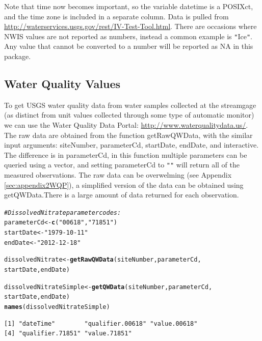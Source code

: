 \documentclass[a4paper,11pt]{article}\usepackage[]{graphicx}\usepackage[]{color}
\makeatletter
\newcommand{\hlstr}[1]{\textcolor[rgb]{0.192,0.494,0.8}{#1}}%
\newcommand{\hlcom}[1]{\textcolor[rgb]{0.678,0.584,0.686}{\textit{#1}}}%
\newcommand{\hlstd}[1]{\textcolor[rgb]{0.345,0.345,0.345}{#1}}%
\newcommand{\hlkwb}[1]{\textcolor[rgb]{0.69,0.353,0.396}{#1}}%
\newcommand{\hlkwd}[1]{\textcolor[rgb]{0.737,0.353,0.396}{\textbf{#1}}}%
\newenvironment{kframe}{%
 \def\at@end@of@kframe{}%
 \ifinner\ifhmode%
  \def\at@end@of@kframe{\end{minipage}}%
  \begin{minipage}{\columnwidth}%
 \fi\fi%
 \def\FrameCommand##1{\hskip\@totalleftmargin \hskip-\fboxsep
 \colorbox{shadecolor}{##1}\hskip-\fboxsep
     \hskip-\linewidth \hskip-\@totalleftmargin \hskip\columnwidth}%
 \MakeFramed {\advance\hsize-\width
   \@totalleftmargin\z@ \linewidth\hsize
   \@setminipage}}%
 {\par\unskip\endMakeFramed%
 \at@end@of@kframe}
\newenvironment{knitrout}{}{} %
\makeatother
\begin{document}
Note that time now becomes important, so the variable datetime is a POSIXct, and the time zone is included in a separate column. Data is pulled from \url{http://waterservices.usgs.gov/rest/IV-Test-Tool.html}. There are occasions where NWIS values are not reported as numbers, instead a common example is \texttt{"}Ice\texttt{"}.  Any value that cannot be converted to a number will be reported as NA in this package.

\newpage


\FloatBarrier

\subsection{Water Quality Values}
\label{sec:usgsWQP}
To get USGS water quality data from water samples collected at the streamgage (as distinct from unit values collected through some type of automatic monitor) we can use the Water Quality Data Portal: \url{http://www.waterqualitydata.us/}. The raw data are obtained from the function  getRawQWData, with the similar input arguments: siteNumber, parameterCd, startDate, endDate, and interactive. The difference is in parameterCd, in this function multiple parameters can be queried using a vector, and setting parameterCd to \texttt{"}\texttt{"} will return all of the measured observations. The raw data can be overwelming (see Appendix \ref{sec:appendix2WQP}), a simplified version of the data can be obtained using getQWData.There is a large amount of data returned for each observation. 


\begin{knitrout}
\color{fgcolor}\begin{kframe}
\begin{alltt}
\hlcom{# Dissolved Nitrate parameter codes:}
\hlstd{parameterCd} \hlkwb{<-} \hlkwd{c}\hlstd{(}\hlstr{"00618"}\hlstd{,}\hlstr{"71851"}\hlstd{)}
\hlstd{startDate} \hlkwb{<-} \hlstr{"1979-10-11"}
\hlstd{endDate} \hlkwb{<-} \hlstr{"2012-12-18"}

\hlstd{dissolvedNitrate} \hlkwb{<-} \hlkwd{getRawQWData}\hlstd{(siteNumber, parameterCd,}
      \hlstd{startDate, endDate)}

\hlstd{dissolvedNitrateSimple} \hlkwb{<-} \hlkwd{getQWData}\hlstd{(siteNumber, parameterCd,}
        \hlstd{startDate, endDate)}
\hlkwd{names}\hlstd{(dissolvedNitrateSimple)}
\end{alltt}
\begin{verbatim}
[1] "dateTime"        "qualifier.00618" "value.00618"    
[4] "qualifier.71851" "value.71851"    
\end{verbatim}
\end{kframe}
\end{knitrout}
\end{document}
